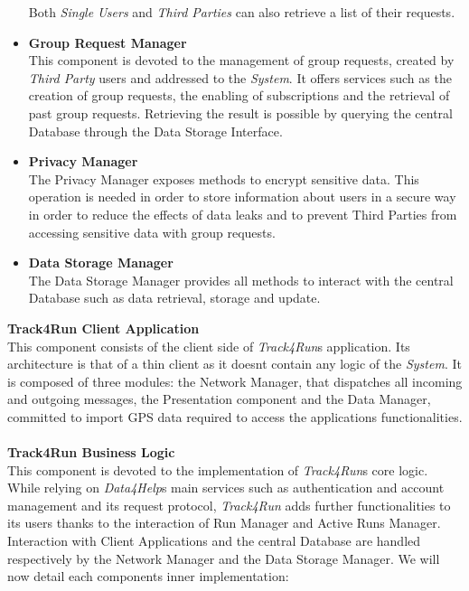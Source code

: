 \documentclass[titlepage]{article}
\begin{document}
\begin{itemize}
		Both {\it Single Users} and {\it Third Parties} can also retrieve a list of their requests.
		\item {\bf Group Request Manager }\\
		This component is devoted to the management of group requests, created by {\it Third Party} users and addressed to the {\it System}. It offers services such as the creation of group requests, the enabling of subscriptions and the retrieval of past group requests. Retrieving the result is possible by querying the central Database through the Data Storage Interface.
		\item {\bf Privacy Manager }\\
		The Privacy Manager exposes methods to encrypt sensitive data. This operation is needed in order to store information about users in a secure way in order to reduce the effects of data leaks and to prevent Third Parties from accessing sensitive data with group requests. 
		\item {\bf Data Storage Manager }\\
		The Data Storage Manager provides all methods to interact with the central Database such as data retrieval, storage and update.
	\end{itemize}    
	{\bf Track4Run Client Application }\\ 
	This component consists of the client side of {\it Track4Run}\textsc{}s application. Its architecture is that of a thin client as it doesn\textsc{}t contain any logic of the {\it System}. It is composed of three modules: the Network Manager, that dispatches all incoming and outgoing messages, the Presentation component and the Data Manager, committed to import GPS data required to access the application\textsc{}s functionalities. \\ \\
	{\bf Track4Run Business Logic }\\ 
	This component is devoted to the implementation of {\it Track4Run}\textsc{}s core logic. While relying on {\it Data4Help}s main services such as authentication and account management and its request protocol, {\it Track4Run} adds further functionalities to its users thanks to the interaction of Run Manager and Active Runs Manager. 
	Interaction with Client Applications and the central Database are handled respectively by the Network Manager and the Data Storage Manager.
	We will now detail each component\textsc{}s inner implementation:
\end{document}
